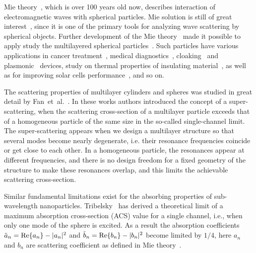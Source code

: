 \documentclass[aps,prl,twocolumn,showpacs,superscriptaddress,groupedaddress]{revtex4-1}
\begin{document}
\maketitle %

Mie theory~\cite{Mie-1908}, which is over 100 years old now, describes
interaction of electromagnetic waves with spherical particles. Mie
solution is still of great
interest~\cite{Suzuki-2008,MacKowski-2012,Lerme-2000,Xu-2005,Li-2006,Gogoi-2010,Santiago-2011},
since it is one of the primary tools for analyzing wave scattering by
spherical objects. Further development of the Mie
theory~\cite{Yang-2003, Pena-scattnlay-2009} made it possible to apply
study the multilayered spherical
particles~\cite{Sheehan-2013,Selmke-2012}.  Such particles have
various applications in cancer treatment~\cite{Zhang-2010,
  Hirsch-2003}, medical diagnostics~\cite{Allain-2002},
cloaking~\cite{Qui-2009, Semouchkina-2013, Ladutenko-2014} and
plasmonic~\cite{Martin-2013, Alu-2005} devices, study on thermal
properties of insulating material~\cite{Xie-2013}, as well as for
improving solar cells performance~\cite{Kameya-2011,Mann-2011}, and so
on.

The scattering properties of multilayer cylinders and spheres was
studied in great detail by Fan~et~al.~\cite{Fan-2010,Fan-2011}.  In
these works authors introduced the concept of a super-scattering, when
the scattering cross-section of a multilayer particle exceeds that of
a homogeneous particle of the same size in the so-called
single-channel limit. The super-scattering appears when we design a
multilayer structure so that several modes become nearly degenerate,
i.e. their resonance frequencies coincide or get close to each
other. In a homogeneous particle, the resonances appear at different
frequencies, and there is no design freedom for a fixed geometry of
the structure to make these resonances overlap, and this limits the
achievable scattering cross-section.

Similar fundamental limitations exist for the absorbing properties of
sub-wavelength nanoparticles.  Tribelsky~\cite{Tribelsky-2011} has
derived a theoretical limit of a maximum absorption cross-section
(ACS) value for a single channel, i.e., when only one mode of the
sphere is excited.  As a result the absorption coefficients
$\tilde{a}_n= {\rm Re}\{a_n\} - |a_n|^2 $ and $\tilde{b}_n= {\rm
  Re}\{b_n\} - |b_n|^2 $ become limited by $1/4$, here $a_n$ and $b_n$
are scattering coefficient as defined in Mie
theory~\cite{Bohren-1983}.
\end{document}
